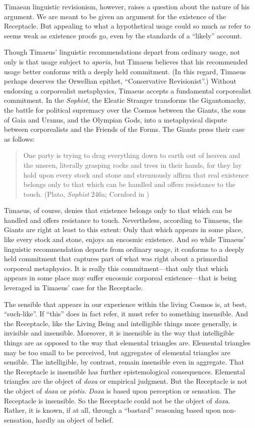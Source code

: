 Timaean linguistic revisionism, however, raises a question about the nature of his argument. We are meant to be given an argument for the existence of the Receptacle. But appealing to what a hypothetical usage could so much as refer to seems weak as existence proofs go, even by the standards of a ``likely'' account. 

Though Timaeus' linguistic recommendations depart from ordinary usage, not only is that usage subject to \emph{aporia}, but Timaeus believes that his recommended usage better conforms with a deeply held commitment. (In this regard, Timaeus perhaps deserves the Orwellian epithet, ``Conservative Revisionist''.) Without endorsing a corporealist metaphysics, Timaeus accepts a fundamental corporealist commitment. In the \emph{Sophist}, the Eleatic Stranger transforms the Gigantomachy, the battle for political supremacy over the Cosmos between the Giants, the sons of Gaia and Uranus, and the Olympian Gods, into a metaphysical dispute between corporealists and the Friends of the Forms. The Giants press their case as follows:
\begin{quote}
	One party is trying to drag everything down to earth out of heaven and the unseen, literally grasping rocks and trees in their hands, for they lay hold upon every stock and stone and strenuously affirm that real existence belongs only to that which can be handled and offers resistance to the touch. (Plato, \emph{Sophist} 246a; Cornford in \citealt{Hamilton:1989fk})
\end{quote}
Timaeus, of course, denies that existence belongs only to that which can be handled and offers resistance to touch. Nevertheless, according to Timaeus, the Giants are right at least to this extent: Only that which appears in some place, like every stock and stone, enjoys an encosmic existence. And so while Timaeus' linguistic recommendation departs from ordinary usage, it conforms to a deeply held commitment that captures part of what was right about a primordial corporeal metaphysics. It is really this commitment---that only that which appears in some place may suffer encosmic corporeal existence---that is being leveraged in Timaeus' case for the Receptacle.

The sensible that appears in our experience within the living Cosmos is, at best, ``such-like''. If ``this'' does in fact refer, it must refer to something insensible. And the Receptacle, like the Living Being and intelligible things more generally, is invisible and insensible. Moreover, it is insensible in the way that intelligible things are as opposed to the way that elemental triangles are. Elemental triangles may be too small to be perceived, but aggregates of elemental triangles are sensible. The intelligible, by contrast, remain insensible even in aggregate. That the Receptacle is insensible has further epistemological consequences. Elemental triangles are the object of \emph{doxa} or empirical judgment. But the Receptacle is not the object of \emph{doxa} or \emph{pistis}. \emph{Doxa} is based upon perception or sensation. The Receptacle is insensible. So the Receptacle could not be the object of \emph{doxa}. Rather, it is known, if at all, through a ``bastard'' reasoning based upon non-sensation, hardly an object of belief.


